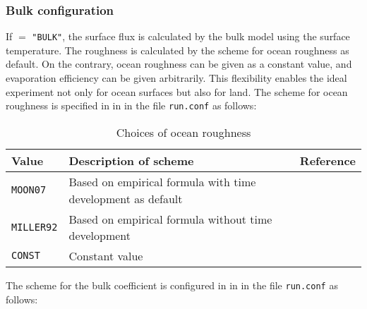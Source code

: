 \subsubsection{Bulk configuration}
If  $=$ \verb|"BULK"|, the surface flux is calculated by the bulk model using the surface temperature. The roughness is calculated by the scheme for ocean roughness as default. On the contrary, ocean roughness can be given as a constant value, and evaporation efficiency can be given arbitrarily. This flexibility enables the ideal experiment not only for ocean surfaces but also for land. The scheme for ocean roughness is specified in  in  in the file \verb|run.conf| as follows:

\begin{table}[hbt]
\begin{center}
  \caption{Choices of ocean roughness}
  \label{tab:nml_roughness}
  \begin{tabularx}{150mm}{lXX} \hline
    \rowcolor[gray]{0.9}  Value & Description of scheme & Reference \\ \hline
      \verb|MOON07|   & Based on empirical formula with time development as default　& \citet{moon_2007} \\
      \verb|MILLER92| & Based on empirical formula without time development          & \citet{miller_1992} \\
      \verb|CONST|    & Constant value & \\
    \hline
  \end{tabularx}
\end{center}
\end{table}

The scheme for the bulk coefficient is configured in  in  in the file \verb|run.conf| as follows:

